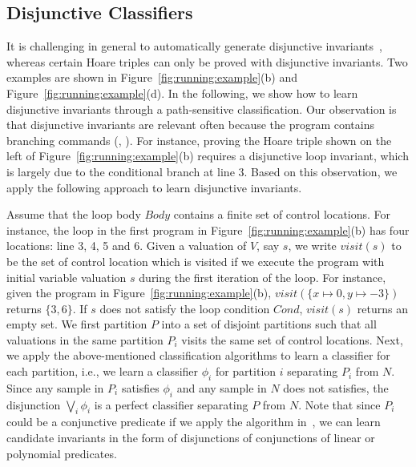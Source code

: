\subsection{Disjunctive Classifiers} \label{disjunctive}
It is challenging in general to automatically generate disjunctive invariants~\cite{DBLP:conf/cav/SharmaDDA11,DBLP:conf/pldi/GulwaniSV08}, whereas certain Hoare triples can only be proved with disjunctive invariants. Two examples are shown in Figure~\ref{fig:running:example}(b) and Figure~\ref{fig:running:example}(d). In the following, we show how to learn disjunctive invariants through a path-sensitive classification. Our observation is that disjunctive invariants are relevant often because the program contains branching commands (, ). %
 For instance, proving the Hoare triple shown on the left of Figure~\ref{fig:running:example}(b) requires a disjunctive loop invariant, which is largely due to the conditional branch at line 3. Based on this observation, we apply the following approach to learn disjunctive invariants.

Assume that the loop body $Body$ contains a finite set of control locations. For instance, the loop in the first program in Figure~\ref{fig:running:example}(b) has four locations: line 3, 4, 5 and 6. Given a valuation of $V$, say $s$, we write $visit(s)$ to be the set of control location which is visited if we execute the program with initial variable valuation $s$ during the first iteration of the loop. For instance, given the program in Figure~\ref{fig:running:example}(b), $visit(\{x \mapsto 0, y \mapsto -3\})$ returns $\{3,6\}$. If $s$ does not satisfy the loop condition $Cond$, $visit(s)$ returns an empty set. We first partition $P$ into a set of disjoint partitions such that all valuations in the same partition $P_i$ visits the same set of control locations. Next, we apply the above-mentioned classification algorithms to learn a classifier for each partition, i.e., we learn a classifier $\phi_i$ for partition $i$ separating $P_i$ from $N$.
Since any sample in $P_i$ satisfies $\phi_i$ and any sample in $N$ does not satisfies, the disjunction $\bigvee_i \phi_i$ is a perfect classifier separating $P$ from $N$. Note that since $P_i$ could be a conjunctive predicate if we apply the algorithm in~\cite{sharma2012interpolants}, we can learn candidate invariants in the form of disjunctions of conjunctions of linear or polynomial predicates.

